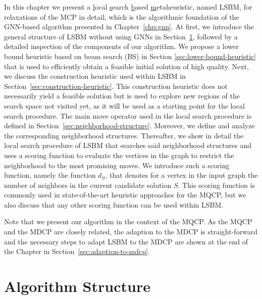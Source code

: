 \documentclass[draft,final]{vutinfth} %
\begin{document}
In this chapter we present a \underline{l}ocal \underline{s}earch \underline{b}ased \underline{m}etaheuristic, named LSBM, for relaxations of the MCP in detail, which is the algorithmic foundation of the GNN-based algorithm presented in Chapter~\ref{chp:gnn}. 
At first, we introduce the general structure of LSBM without using GNNs in Section~\ref{sec:algorithm-structure}, followed by a detailed inspection of the components of our algorithm. We propose a lower bound heuristic based on beam search (BS) in Section \ref{sec:lower-bound-heuristic} that is used to efficiently obtain a feasible initial solution of high quality. 
Next, we discuss the construction heuristic used within LSBM in Section~\ref{sec:construction-heuristic}. This construction heuristic does not necessarily yield a feasible solution but is used to explore new regions of the search space not visited yet, as it will be used as a starting point for the local search procedure. 
The main move operator used in the local search procedure is defined in Section~\ref{sec:neighborhood-structure}. Moreover, we define and analyze the corresponding neighborhood structures. 
Thereafter, we show in detail the local search procedure of LSBM that searches said neighborhood structures and uses a scoring function to evaluate the vertices in the graph to restrict the neighborhood to the most promising moves. We introduce such a scoring function, namely the function $d_S$, that denotes for a vertex in the input graph the number of neighbors in the current candidate solution $S$. This scoring function is commonly used in state-of-the-art heuristic approaches for the MQCP, but we also discuss that any other scoring function can be used within LSBM. 

Note that we present our algorithm in the context of the MQCP. As the MQCP and the MDCP are closely related, the adaption to the MDCP is straight-forward and the necessary steps to adapt LSBM to the MDCP are shown at the end of the Chapter in Section~\ref{sec:adaption-to-mdcp}. 

\section{Algorithm Structure} \label{sec:algorithm-structure}
\end{document}
